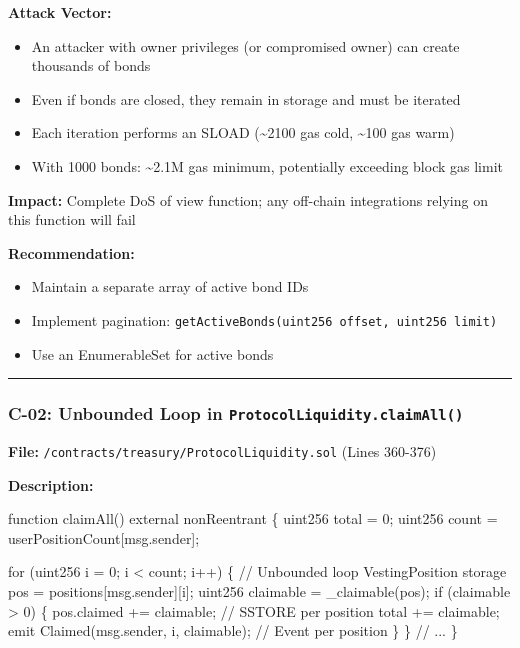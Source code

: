 \documentclass[
]{article}
\newenvironment{Shaded}{}{}
\newcommand{\NormalTok}[1]{#1}
\providecommand{\tightlist}{%
  \setlength{\itemsep}{0pt}\setlength{\parskip}{0pt}}
\begin{document}
\textbf{Attack Vector:}

\begin{itemize}
\tightlist
\item
  An attacker with owner privileges (or compromised owner) can create
  thousands of bonds
\item
  Even if bonds are closed, they remain in storage and must be iterated
\item
  Each iteration performs an SLOAD (\textasciitilde2100 gas cold,
  \textasciitilde100 gas warm)
\item
  With 1000 bonds: \textasciitilde2.1M gas minimum, potentially
  exceeding block gas limit
\end{itemize}

\textbf{Impact:} Complete DoS of view function; any off-chain
integrations relying on this function will fail

\textbf{Recommendation:}

\begin{itemize}
\tightlist
\item
  Maintain a separate array of active bond IDs
\item
  Implement pagination:
  \texttt{getActiveBonds(uint256\ offset,\ uint256\ limit)}
\item
  Use an EnumerableSet for active bonds
\end{itemize}

\begin{center}\rule{0.5\linewidth}{0.5pt}\end{center}

\subsubsection{\texorpdfstring{C-02: Unbounded Loop in
\texttt{ProtocolLiquidity.claimAll()}}{C-02: Unbounded Loop in ProtocolLiquidity.claimAll()}}\label{c-02-unbounded-loop-in-protocolliquidityclaimall}

\textbf{File:} \texttt{/contracts/treasury/ProtocolLiquidity.sol} (Lines
360-376)

\textbf{Description:}

\begin{Shaded}
\begin{Highlighting}[]
\NormalTok{function claimAll() external nonReentrant \{}
\NormalTok{    uint256 total = 0;}
\NormalTok{    uint256 count = userPositionCount[msg.sender];}

\NormalTok{    for (uint256 i = 0; i \textless{} count; i++) \{           // Unbounded loop}
\NormalTok{        VestingPosition storage pos = positions[msg.sender][i];}
\NormalTok{        uint256 claimable = \_claimable(pos);}
\NormalTok{        if (claimable \textgreater{} 0) \{}
\NormalTok{            pos.claimed += claimable;               // SSTORE per position}
\NormalTok{            total += claimable;}
\NormalTok{            emit Claimed(msg.sender, i, claimable); // Event per position}
\NormalTok{        \}}
\NormalTok{    \}}
\NormalTok{    // ...}
\NormalTok{\}}
\end{Highlighting}
\end{Shaded}
\end{document}
